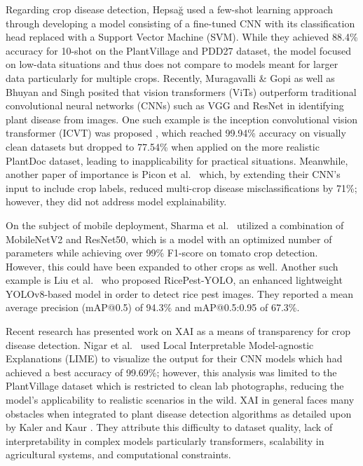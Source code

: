 \documentclass[runningheads]{llncs}
\begin{document}
Regarding crop disease detection, Hepsağ \cite{hepsag2023} used a few-shot learning approach through developing a model consisting of a fine-tuned CNN with its classification head replaced with a Support Vector Machine (SVM). While they achieved 88.4\% accuracy for 10-shot on the PlantVillage and PDD27 dataset, the model focused on low-data situations and thus does not compare to models meant for larger data particularly for multiple crops. Recently, Muragavalli \& Gopi \cite{murugavalli2025plant} as well as Bhuyan and Singh \cite{bhuyan2024evaluating} posited that vision transformers (ViTs) outperform traditional convolutional neural networks (CNNs) such as VGG and ResNet in identifying plant disease from images. One such example is the inception convolutional vision transformer (ICVT) was proposed \cite{yu2023icvt}, which reached 99.94\% accuracy on visually clean datasets but dropped to 77.54\% when applied on the more realistic PlantDoc dataset, leading to inapplicability for practical situations. Meanwhile, another paper of importance is Picon et al.~\cite{picon2019conditional} which, by extending their CNN's input to include crop labels, reduced multi-crop disease misclassifications by 71\%; however, they did not address model explainability.

On the subject of mobile deployment, Sharma et al.~\cite{sharma2025} utilized a combination of MobileNetV2 and ResNet50, which is a model with an optimized number of parameters while achieving over 99\% F1-score on tomato crop detection. However, this could have been expanded to other crops as well. Another such example is Liu et al.~\cite{liu2025} who proposed RicePest-YOLO, an enhanced lightweight YOLOv8-based model in order to detect rice pest images. They reported a mean average precision (mAP@0.5) of 94.3\% and mAP@0.5:0.95 of 67.3\%.

Recent research has presented work on XAI as a means of transparency for crop disease detection. Nigar et al.~\cite{nigar2024} used Local Interpretable Model-agnostic Explanations (LIME) to visualize the output for their CNN models which had achieved a best accuracy of 99.69\%; however, this analysis was limited to the PlantVillage dataset which is restricted to clean lab photographs, reducing the model's applicability to realistic scenarios in the wild. XAI in general faces many obstacles when integrated to plant disease detection algorithms as detailed upon by Kaler and Kaur \cite{kaler2025}. They attribute this difficulty to dataset quality, lack of interpretability in complex models particularly transformers, scalability in agricultural systems, and computational constraints.
\end{document}

